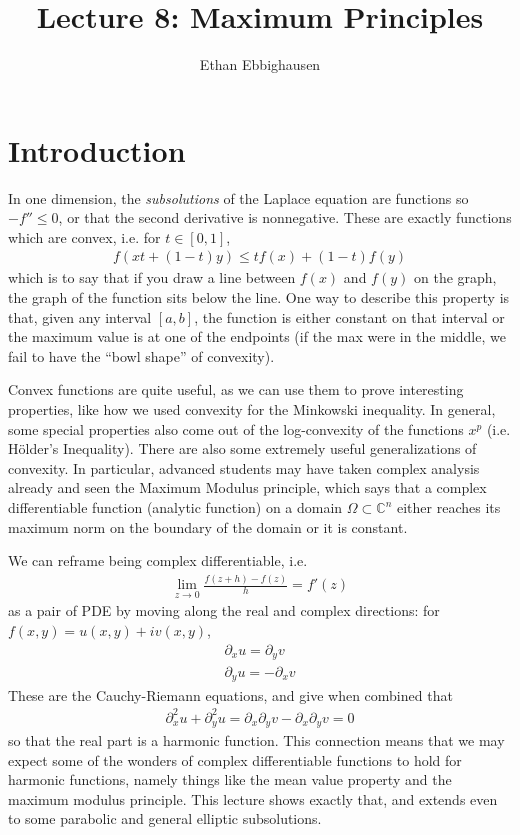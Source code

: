 \documentclass{article}
\title{Lecture 8: Maximum Principles}
\author{Ethan Ebbighausen}
\date{}
\newcommand{\C}{{\mathbb{C}}}
\newcommand{\pd}{\partial}
\begin{document}
	\pagestyle{fancy}
	\fancyfoot{} 
	
	\maketitle
	
	\section{Introduction}
	
	In one dimension, the \textit{subsolutions} of the Laplace equation are functions so $-f'' \leq 0$, or that the second derivative is nonnegative. These are exactly functions which are convex, i.e. for $t \in [0,1]$, 
	\begin{align*}
		f(xt + (1-t)y) \leq tf(x) + (1-t)f(y)
	\end{align*}
	which is to say that if you draw a line between $f(x)$ and $f(y)$ on the graph, the graph of the function sits below the line. One way to describe this property is that, given any interval $[a,b]$, the function is either constant on that interval or the maximum value is at one of the endpoints (if the max were in the middle, we fail to have the ``bowl shape'' of convexity). 
	
	Convex functions are quite useful, as we can use them to prove interesting properties, like how we used convexity for the Minkowski inequality. In general, some special properties also come out of the log-convexity of the functions $x^{p}$ (i.e. H{\"o}lder's Inequality). There are also some extremely useful generalizations of convexity. In particular, advanced students may have taken complex analysis already and seen the Maximum Modulus principle, which says that a complex differentiable function (analytic function) on a domain $\Omega \subset \C^n$ either reaches its maximum norm on the boundary of the domain or it is constant. 
	
	We can reframe being complex differentiable, i.e. 
	\begin{align*}
		\lim_{z \to 0} \frac{f(z+h)-f(z)}{h} = f'(z)
	\end{align*}
	as a pair of PDE by moving along the real and complex directions: for $f(x,y) = u(x,y) + iv(x,y)$,
	\begin{align*}
		\pd_{x}u = \pd_{y}v \\
		\pd_{y}u = -\pd_{x}v
	\end{align*} 
	These are the Cauchy-Riemann equations, and give when combined that 
	\begin{align*}
		\pd_{x}^{2}u + \pd_{y}^{2} u = \pd_{x}\pd_{y} v - \pd_{x}\pd_{y} v = 0
	\end{align*}
	so that the real part is a harmonic function. This connection means that we may expect some of the wonders of complex differentiable functions to hold for harmonic functions, namely things like the mean value property and the maximum modulus principle. This lecture shows exactly that, and extends even to some parabolic and general elliptic subsolutions. 
	
\end{document}
